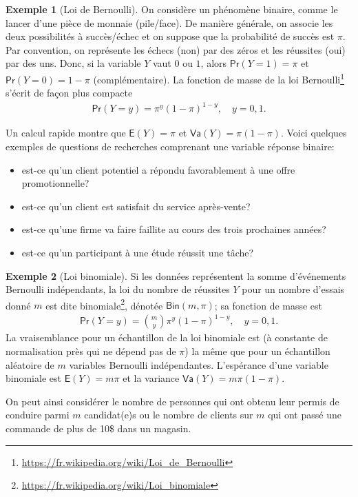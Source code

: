 \documentclass[
  11pt,
  letterpaper,
]{book}
\providecommand{\tightlist}{%
  \setlength{\itemsep}{0pt}\setlength{\parskip}{0pt}}
\renewcommand{\href}[2]{#2\footnote{\url{#1}}}
\theoremstyle{definition}
\theoremstyle{definition}
\newtheorem{example}{Exemple}[chapter]
\theoremstyle{definition}
\theoremstyle{remark}
\begin{document}
\begin{example}[Loi de Bernoulli]
\protect\hypertarget{exm:loibern}{}{\label{exm:loibern} {} }On considère un phénomène binaire, comme le lancer d'une pièce de monnaie (pile/face). De manière générale, on associe les deux possibilités à succès/échec et on suppose que la probabilité de succès est \(\pi\). Par convention, on représente les échecs (non) par des zéros et les réussites (oui) par des uns. Donc, si la variable \(Y\) vaut \(0\) ou \(1\), alors \(\mathsf{Pr}(Y=1)=\pi\) et \(\mathsf{Pr}(Y=0)=1-\pi\) (complémentaire). La fonction de masse de la \href{https://fr.wikipedia.org/wiki/Loi_de_Bernoulli}{loi Bernoulli} s'écrit de façon plus compacte
\begin{align*}
\mathsf{Pr}(Y=y) = \pi^y (1-\pi)^{1-y}, \quad y=0, 1.
\end{align*}

Un calcul rapide montre que \(\mathsf{E}(Y)=\pi\) et \(\mathsf{Va}(Y)=\pi(1-\pi)\).
Voici quelques exemples de questions de recherches comprenant une variable réponse binaire:

\begin{itemize}
\tightlist
\item
  est-ce qu'un client potentiel a répondu favorablement à une offre
  promotionnelle?
\item
  est-ce qu'un client est satisfait du service après-vente?
\item
  est-ce qu'une firme va faire faillite au cours des trois prochaines années?
\item
  est-ce qu'un participant à une étude réussit une tâche?
\end{itemize}
\end{example}

\begin{example}[Loi binomiale]
\protect\hypertarget{exm:loibinom}{}{\label{exm:loibinom} {} }Si les données représentent la somme d'événements Bernoulli indépendants, la loi du nombre de réussites \(Y\) pour un nombre d'essais donné \(m\) est dite \href{https://fr.wikipedia.org/wiki/Loi_binomiale}{binomiale}, dénotée \(\mathsf{Bin}(m, \pi)\); sa fonction de masse est
\begin{align*}
\mathsf{Pr}(Y=y) = \binom{m}{y}\pi^y (1-\pi)^{1-y}, \quad y=0, 1.
\end{align*}
La vraisemblance pour un échantillon de la loi binomiale est (à constante de normalisation près qui ne dépend pas de \(\pi\)) la même que pour un échantillon aléatoire de \(m\) variables Bernoulli indépendantes. L'espérance d'une variable binomiale est \(\mathsf{E}(Y)=m\pi\) et la variance \(\mathsf{Va}(Y)=m\pi(1-\pi)\).

On peut ainsi considérer le nombre de personnes qui ont obtenu leur permis de conduire parmi \(m\) candidat(e)s ou le nombre de clients sur \(m\) qui ont passé une commande de plus de 10\$ dans un magasin.
\end{example}
\end{document}
